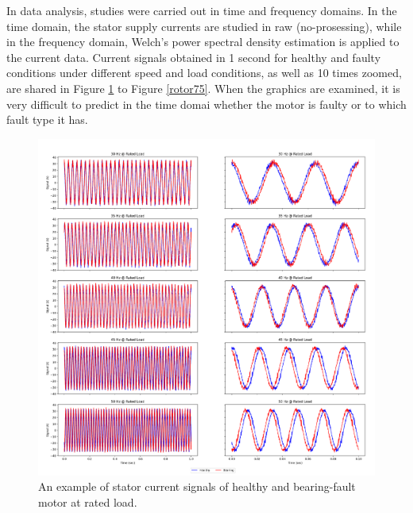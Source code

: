In data analysis, studies were carried out in time and frequency domains. In the time domain, the stator supply currents are studied in raw (no-prosessing), while in the frequency domain, Welch's power spectral density estimation is applied to the current data. Current signals obtained in 1 second for healthy and faulty conditions under different speed and load conditions, as well as 10 times zoomed, are shared in Figure \ref{bearing100} to Figure \ref{rotor75}. When the graphics are examined, it is very difficult to predict in the time domai whether the motor is faulty or to which fault type it has. 
\pagebreak
\begin{figure}[p]
	\centering
	\includegraphics[width=0.75\paperwidth,keepaspectratio=true]{./fig/bearing_100.png}
	\caption{An example of stator current signals of healthy and bearing-fault motor at rated load.}	
	\label{bearing100}
\end{figure}
\pagebreak
